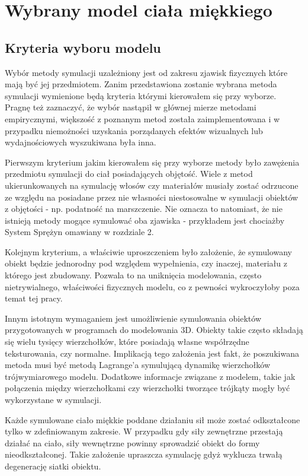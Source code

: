 \chapter{Wybrany model ciała miękkiego}

\section{Kryteria wyboru modelu}

Wybór metody symulacji uzależniony jest od zakresu zjawisk fizycznych które mają
być jej przedmiotem. Zanim przedstawiona zostanie wybrana metoda symulacji
wymienione będą kryteria którymi kierowałem się przy wyborze.
Pragnę też zaznaczyć, że wybór nastąpił w głównej mierze metodami empirycznymi,
większość z poznanym metod została zaimplementowana i w przypadku niemożności
uzyskania porządanych efektów wizualnych lub wydajnościowych wyszukiwana była
inna.

Pierwszym kryterium jakim kierowałem się przy wyborze metody było
zawężenia przedmiotu symulacji do ciał posiadających objętość. Wiele z
metod ukierunkowanych na symulację włosów czy materiałów musiały zostać odrzucone ze
względu na posiadane przez nie własności niestosowalne w
symulacji obiektów z objętości - np. podatność na marszczenie. Nie oznacza to
natomiast, że nie istnieją metody mogące symulować oba zjawiska - przykładem
jest chociażby System Sprężyn omawiany w rozdziale 2.

Kolejnym kryterium, a właściwie uproszczeniem było założenie, że
symulowany obiekt będzie jednorodny pod względem wypełnienia, czy inaczej,
materiału z którego jest zbudowany. Pozwala to na
uniknięcia modelowania, często nietrywialnego, właściwości fizycznych modelu, co z pewności
wykroczyłoby poza temat tej pracy. 

Innym istotnym wymaganiem jest umożliwienie symulowania obiektów
przygotowanych w programach do modelowania 3D. Obiekty takie często składają się
wielu tysięcy wierzchołków, które posiadają własne współrzędne teksturowania,
czy normalne. Implikacją tego założenia jest fakt, że poszukiwana metoda musi być
metodą Lagrange'a symulującą dynamikę wierzchołków trójwymiarowego modelu.
Dodatkowe informacje związane z modelem, takie jak połączenia między
wierzchołkami czy wierzchołki tworzące trójkąty mogły być wykorzystane w
symulacji.

Każde symulowane ciało miękkie poddane działaniu sił może zostać odkształcone
tylko w zdefiniowanym zakresie. W przypadku gdy siły zewnętrzne przestają działać
na ciało, siły wewnętrzne powinny sprowadzić obiekt do formy nieodkształconej.
Takie założenie upraszcza symulację gdyż wyklucza trwałą degenerację siatki
obiektu.

